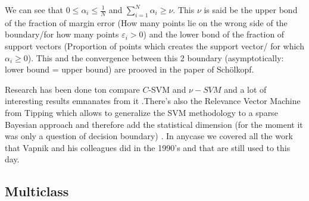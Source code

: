 \documentclass[a4paper,11pt]{article}
\numberwithin{equation}{section}
\begin{document}
We can see that $ 0 \leq \alpha_i \leq \frac{1}{N} $ and $\sum_{i=1}^N\alpha_i \geq \nu $. This $\nu$ is said be the upper bond of the fraction of margin error (How many points lie on the wrong side of the boundary/for how many points $ \varepsilon_i > 0$) and the lower bond of the fraction of support vectors (Proportion of points which creates the support vector/ for which $\alpha_i \ge 0$). This and the convergence between this 2 boundary (asymptotically: lower bound = upper bound) are prooved in the paper of Sch{\"o}lkopf.

Research has been done ton compare $C$-SVM and $\nu-SVM$ and a lot of interesting results emnanates from it \cite{NuSVM} .There's also the Relevance Vector Machine from Tipping \cite{tipping2001sparse} which allows to generalize the SVM methodology to a sparse Bayesian approach and therefore add the statistical dimension (for the moment it was only a question of decision boundary) . In anycase we covered all the work that Vapnik and his colleagues did in the 1990's and that are still used to this day. 


\subsection{Multiclass}
\end{document}
